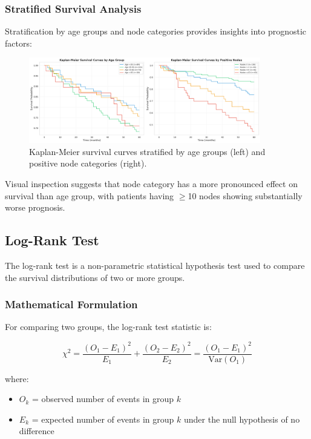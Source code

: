 \documentclass[12pt,a4paper]{article}
\begin{document}
\subsubsection{Stratified Survival Analysis}

Stratification by age groups and node categories provides insights into prognostic factors:

\begin{figure}[H]
\centering
\includegraphics[width=0.9\textwidth]{kaplan_meier_stratified.png}
\caption{Kaplan-Meier survival curves stratified by age groups (left) and positive node categories (right).}
\label{fig:km_stratified}
\end{figure}

Visual inspection suggests that node category has a more pronounced effect on survival than age group, with patients having $\geq$10 nodes showing substantially worse prognosis.

\subsection{Log-Rank Test}

The log-rank test is a non-parametric statistical hypothesis test used to compare the survival distributions of two or more groups.

\subsubsection{Mathematical Formulation}

For comparing two groups, the log-rank test statistic is:

\begin{equation}
\chi^2 = \frac{(O_1 - E_1)^2}{E_1} + \frac{(O_2 - E_2)^2}{E_2} = \frac{(O_1 - E_1)^2}{\text{Var}(O_1)}
\label{eq:logrank}
\end{equation}

where:
\begin{itemize}
    \item \(O_k\) = observed number of events in group \(k\)
    \item \(E_k\) = expected number of events in group \(k\) under the null hypothesis of no difference
\end{itemize}
\end{document}
